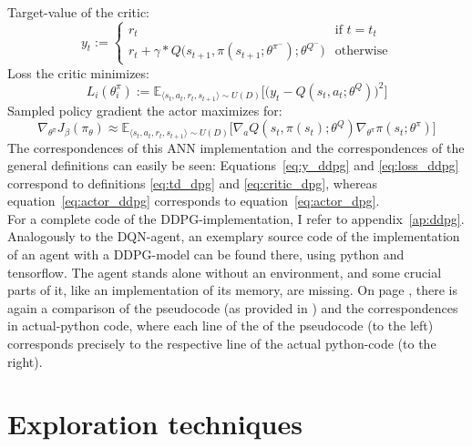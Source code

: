 \noindent Target-value of the critic:
\begin{equation} \label{eq:y_ddpg}
	y_t := \begin{cases} 
	r_t & \text{if } t = t_t\\
	r_t + \gamma * Q\big(s_{t+1}, \pi(s_{t+1};\theta^{\pi^-});\theta^{Q^-} \big)  & \text{otherwise} 
	\end{cases} %
\end{equation}
\noindent Loss the critic minimizes:
\begin{equation} \label{eq:loss_ddpg}
	L_i(\theta^\pi_i) := \mathds{E}_{\langle s_t,a_t,r_t,s_{t+1} \rangle \sim U(D)} \Big[\Big( y_t - Q(s_t,a_t;\theta^Q) \Big)^2\Big]
\end{equation}
\noindent Sampled policy gradient the actor maximizes for:
\begin{equation} \label{eq:actor_ddpg}
	\nabla_{\theta^\pi}J_\beta(\pi_\theta) \approx \mathds{E}_{\langle s_t,a_t,r_t,s_{t+1} \rangle \sim U(D)} \Big[ \nabla_a Q(s_t,\pi(s_t);\theta^Q) \nabla_{\theta^\pi} \pi(s_t;\theta^\pi) \Big]
\end{equation}
The correspondences of this ANN implementation and the correspondences of the general definitions can easily be seen: Equations~\ref{eq:y_ddpg} and \ref{eq:loss_ddpg} correspond to definitions \ref{eq:td_dpg} and \ref{eq:critic_dpg}, whereas equation~\ref{eq:actor_ddpg} corresponds to equation~\ref{eq:actor_dpg}.\\

For a complete code of the DDPG-implementation, I refer to appendix~\ref{ap:ddpg}. Analogously to the DQN-agent, an exemplary source code of the implementation of an agent with a DDPG-model can be found there, using python and tensorflow. The agent stands alone without an environment, and some crucial parts of it, like an implementation of its memory, are missing. On page \pageref{ap:ddpg_comparison}, there is again a comparison of the pseudocode (as provided in \cite{lillicrap_continuous_2015}) and the correspondences in actual-python code, where each line of the of the pseudocode (to the left) corresponds precisely to the respective line of the actual python-code (to the right).



\section{Exploration techniques}

